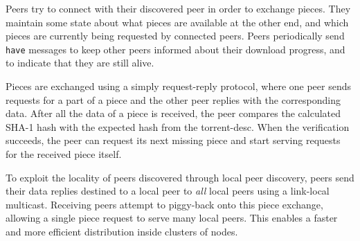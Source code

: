 Peers try to connect with their discovered peer in order to exchange pieces. They maintain some state about what pieces are available at the other end, and which pieces are currently being requested by connected peers. Peers periodically send \texttt{have} messages to keep other peers informed about their download progress, and to indicate that they are still alive.

Pieces are exchanged using a simply request-reply protocol, where one peer sends requests for a part of a piece and the other peer replies with the corresponding data. After all the data of a piece is received, the peer compares the calculated SHA-1 hash with the expected hash from the \gls{torrent-desc}. When the verification succeeds, the peer can request its next missing piece and start serving requests for the received piece itself.

To exploit the locality of peers discovered through local peer discovery, peers send their data replies destined to a local peer to \emph{all} local peers using a link-local multicast. Receiving peers attempt to piggy-back onto this piece exchange, allowing a single piece request to serve many local peers. This enables a faster and more efficient distribution inside clusters of nodes.

